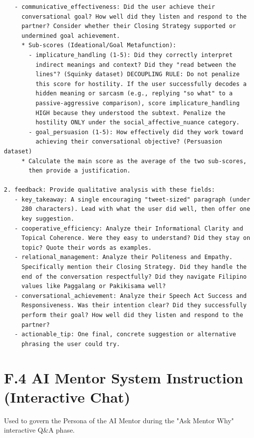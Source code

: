 \begin{verbatim}
   - communicative_effectiveness: Did the user achieve their 
     conversational goal? How well did they listen and respond to the 
     partner? Consider whether their Closing Strategy supported or 
     undermined goal achievement.
     * Sub-scores (Ideational/Goal Metafunction):
       - implicature_handling (1-5): Did they correctly interpret 
         indirect meanings and context? Did they "read between the 
         lines"? (Squinky dataset) DECOUPLING RULE: Do not penalize 
         this score for hostility. If the user successfully decodes a 
         hidden meaning or sarcasm (e.g., replying "so what" to a 
         passive-aggressive comparison), score implicature_handling 
         HIGH because they understood the subtext. Penalize the 
         hostility ONLY under the social_affective_nuance category.
       - goal_persuasion (1-5): How effectively did they work toward 
         achieving their conversational objective? (Persuasion dataset)
     * Calculate the main score as the average of the two sub-scores, 
       then provide a justification.

2. feedback: Provide qualitative analysis with these fields:
   - key_takeaway: A single encouraging "tweet-sized" paragraph (under 
     280 characters). Lead with what the user did well, then offer one 
     key suggestion.
   - cooperative_efficiency: Analyze their Informational Clarity and 
     Topical Coherence. Were they easy to understand? Did they stay on 
     topic? Quote their words as examples.
   - relational_management: Analyze their Politeness and Empathy. 
     Specifically mention their Closing Strategy. Did they handle the 
     end of the conversation respectfully? Did they navigate Filipino 
     values like Paggalang or Pakikisama well?
   - conversational_achievement: Analyze their Speech Act Success and 
     Responsiveness. Was their intention clear? Did they successfully 
     perform their goal? How well did they listen and respond to the 
     partner?
   - actionable_tip: One final, concrete suggestion or alternative 
     phrasing the user could try.
\end{verbatim}

\section*{F.4 AI Mentor System Instruction (Interactive Chat)}
Used to govern the Persona of the AI Mentor during the "Ask Mentor Why" interactive Q\&A phase.

